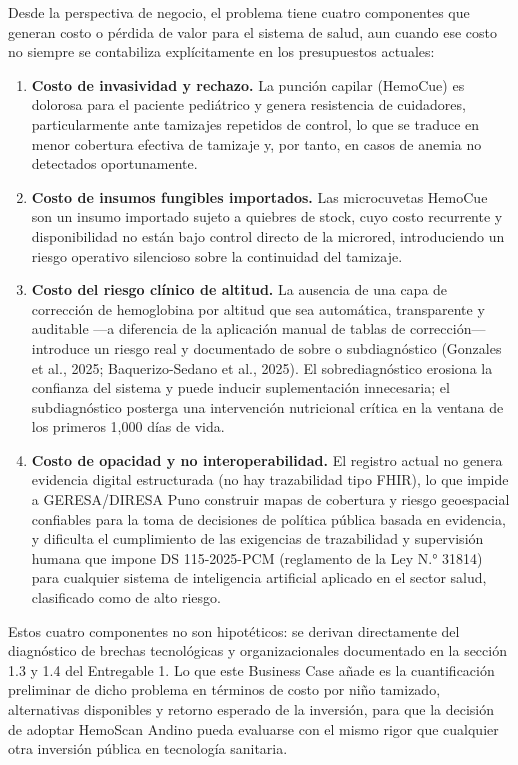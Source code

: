 \documentclass[11pt,a4paper]{article}
\providecommand{\tightlist}{%
  \setlength{\itemsep}{0pt}\setlength{\parskip}{0pt}}
\begin{document}
Desde la perspectiva de negocio, el problema tiene cuatro componentes que generan costo o pérdida de valor para el sistema de salud, aun cuando ese costo no siempre se contabiliza explícitamente en los presupuestos actuales:

\begin{enumerate}
\def\labelenumi{\arabic{enumi}.}
\tightlist
\item
  \textbf{Costo de invasividad y rechazo.} La punción capilar (HemoCue) es dolorosa para el paciente pediátrico y genera resistencia de cuidadores, particularmente ante tamizajes repetidos de control, lo que se traduce en menor cobertura efectiva de tamizaje y, por tanto, en casos de anemia no detectados oportunamente.
\item
  \textbf{Costo de insumos fungibles importados.} Las microcuvetas HemoCue son un insumo importado sujeto a quiebres de stock, cuyo costo recurrente y disponibilidad no están bajo control directo de la microred, introduciendo un riesgo operativo silencioso sobre la continuidad del tamizaje.
\item
  \textbf{Costo del riesgo clínico de altitud.} La ausencia de una capa de corrección de hemoglobina por altitud que sea automática, transparente y auditable ---a diferencia de la aplicación manual de tablas de corrección--- introduce un riesgo real y documentado de sobre o subdiagnóstico (Gonzales et al., 2025; Baquerizo-Sedano et al., 2025). El sobrediagnóstico erosiona la confianza del sistema y puede inducir suplementación innecesaria; el subdiagnóstico posterga una intervención nutricional crítica en la ventana de los primeros 1,000 días de vida.
\item
  \textbf{Costo de opacidad y no interoperabilidad.} El registro actual no genera evidencia digital estructurada (no hay trazabilidad tipo FHIR), lo que impide a GERESA/DIRESA Puno construir mapas de cobertura y riesgo geoespacial confiables para la toma de decisiones de política pública basada en evidencia, y dificulta el cumplimiento de las exigencias de trazabilidad y supervisión humana que impone DS 115-2025-PCM (reglamento de la Ley N.° 31814) para cualquier sistema de inteligencia artificial aplicado en el sector salud, clasificado como de alto riesgo.
\end{enumerate}

Estos cuatro componentes no son hipotéticos: se derivan directamente del diagnóstico de brechas tecnológicas y organizacionales documentado en la sección 1.3 y 1.4 del Entregable 1. Lo que este Business Case añade es la cuantificación preliminar de dicho problema en términos de costo por niño tamizado, alternativas disponibles y retorno esperado de la inversión, para que la decisión de adoptar HemoScan Andino pueda evaluarse con el mismo rigor que cualquier otra inversión pública en tecnología sanitaria.
\end{document}
